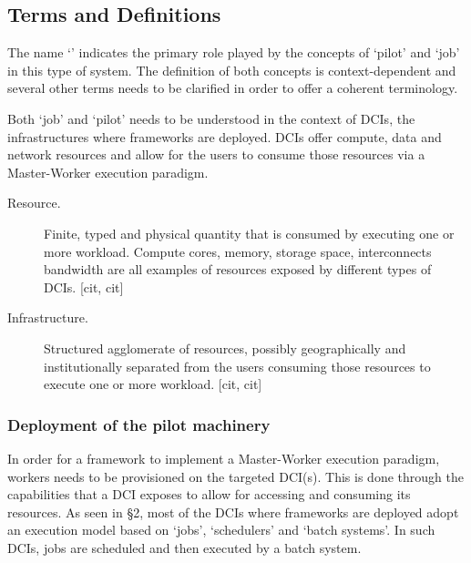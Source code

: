 \documentclass{sig-alternate}
\begin{document}
\subsection{Terms and Definitions}

The name `\pilotjob' indicates the primary role played by the concepts of `pilot' and `job' in this type of system. The definition of both concepts is context-dependent and several other terms needs to be clarified in order to offer a coherent terminology.

Both `job' and `pilot' needs to be understood in the context of DCIs,  the infrastructures where \pilotjobs frameworks are deployed. DCIs offer compute, data and network resources and \pilotjobs allow for the users to consume those resources via a Master-Worker execution paradigm.

\begin{description}
  \item[Resource.] Finite, typed and physical quantity that is consumed by executing one or more workload. Compute cores, memory, storage space,  interconnects bandwidth are all examples of resources exposed by different types of DCIs. [cit, cit]
  \item[Infrastructure.] Structured agglomerate of resources, possibly geographically and institutionally separated from the users consuming those resources to execute one or more workload. [cit, cit]
\end{description}

\subsubsection{Deployment of the pilot machinery}

In order for a \pilotjob framework to implement a Master-Worker
execution paradigm, workers needs to be provisioned on the targeted
DCI(s). This is done through the capabilities that a DCI exposes to
allow for accessing and consuming its resources. As seen in \S 2, most
of the DCIs where \pilotjobs frameworks are deployed adopt an
execution model based on `jobs', `schedulers' and `batch systems'. In
such DCIs, jobs are scheduled and then executed by a batch system.

\end{document}
